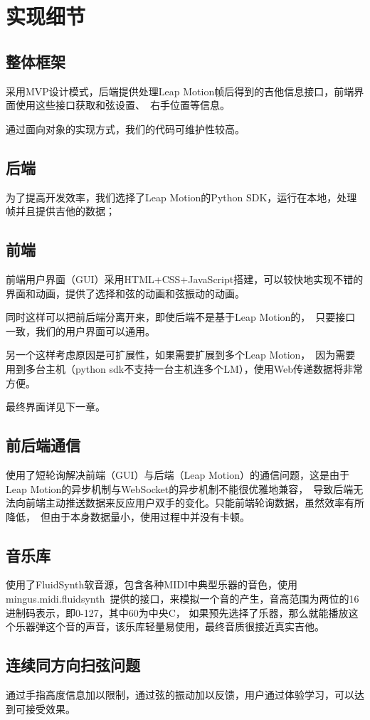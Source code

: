 \chapter{实现细节}

    \section{整体框架}

        采用MVP设计模式，后端提供处理Leap Motion帧后得到的吉他信息接口，前端界面使用这些接口获取和弦设置、\
        右手位置等信息。

        通过面向对象的实现方式，我们的代码可维护性较高。

    \section{后端}
        为了提高开发效率，我们选择了Leap Motion的Python SDK，运行在本地，处理帧并且提供吉他的数据；\

    \section{前端}
        前端用户界面（GUI）采用HTML+CSS+JavaScript搭建，可以较快地实现不错的界面和动画，提供了选择和弦的动画和弦振动的动画。\

        同时这样可以把前后端分离开来，即使后端不是基于Leap Motion的，\
        只要接口一致，我们的用户界面可以通用。

        另一个这样考虑原因是可扩展性，如果需要扩展到多个Leap Motion，\
        因为需要用到多台主机（python sdk不支持一台主机连多个LM），使用Web传递数据将非常方便。

        最终界面详见下一章。

    \section{前后端通信}
    使用了短轮询解决前端（GUI）与后端（Leap Motion）的通信问题，这是由于Leap Motion的异步机制与WebSocket的异步机制不能很优雅地兼容，\
    导致后端无法向前端主动推送数据来反应用户双手的变化。只能前端轮询数据，虽然效率有所降低，\
    但由于本身数据量小，使用过程中并没有卡顿。

    \section{音乐库}
    使用了FluidSynth软音源，包含各种MIDI中典型乐器的音色，使用mingus.midi.fluidsynth\
    提供的接口，来模拟一个音的产生，音高范围为两位的16进制码表示，即0-127，其中60为中央C，
    如果预先选择了乐器，那么就能播放这个乐器弹这个音的声音，该乐库轻量易使用，最终音质很接近真实吉他。

    \section{连续同方向扫弦问题}
    通过手指高度信息加以限制，通过弦的振动加以反馈，用户通过体验学习，可以达到可接受效果。
 
